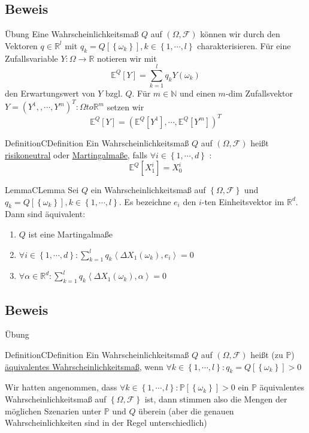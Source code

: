 \documentclass[11.5 pt, a4paper]{memoir}
\begin{document}
\subsection*{Beweis} Übung
Eine Wahrscheinlichkeitsmaß $ Q $ auf $ \left( \Omega, \mathcal{F} \right)  $ können wir durch den Vektoren $ q \in \mathbb{R}^{l} $ 
mit $ q_k = Q \left[ \left\{ \omega_k \right\}  \right] , k \in \left\{ 1 , \cdots,  l \right\}  $ charakterisieren. Für eine Zufallsvariable $ Y : \Omega \to \mathbb{R} $ notieren wir mit 
$$ \mathbb{E}^{Q} \left[ Y \right] = \sum_{k=1}^{l} q_k Y \left( \omega_{k} \right)  $$
den Erwartungswert von $ Y $ bzgl. $ Q $. Für $ m \in \mathbb{N} $ und einen $ m $-dim Zufallsvektor $ Y = \left( Y^{1}, , \cdots,  
Y^{m}\right)^{T}: \Omega to \mathbb{R}^{m} $ setzen wir 
$$ \mathbb{E}^{Q} \left[ Y \right] = \left( \mathbb{E}^{Q} \left[ Y^{1} \right], \cdots,  \mathbb{E}^{Q} \left[ Y^{m} \right]  \right) ^{T}  $$
\begin{ibox}[2.3]{Definition}{CDefinition}
	Ein Wahrscheinlichkeitsmaß $ Q $  auf $ \left( \Omega, \mathcal{F} \right) $ heißt \underline{risikoneutral} oder 
	\underline{Martingalmaße}, falls $ \forall i \in \left\{ 1 , \cdots,  d \right\}  $ :
	$$ \mathbb{E}^{Q} \left[ X_1^{i} \right] = X_{0}^{i}$$
\end{ibox}

\begin{ibox}[2.4]{Lemma}{CLemma}
    Sei $ Q $ ein Wahrscheinlichkeitsmaß auf $ \left\{ \Omega, \mathcal{F} \right\}  $ und $ q_k = Q \left[ \left\{ \omega_k \right\}  \right] , k \in \left\{ 1 , \cdots,  l \right\}  $. Es bezeichne $ e_i $ den $ i$-ten Einheitsvektor im $ \mathbb{R}^{d} $. Dann sind äquivalent:
		\begin{enumerate}[label=\alph*)]
			\item $ Q $ ist eine Martingalmaße
			\item $ \forall i \in \left\{ 1 , \cdots,  d \right\} : \sum_{k=1}^{l} q_k \left< \Delta X_1 (\omega_k), e_i \right>  = 0$ 
			\item $ \forall \alpha \in \mathbb{R}^{d} : \sum_{k=1}^{l} q_k \left< \Delta X_1 (\omega_k), \alpha \right>  = 0$ 
		\end{enumerate}
\end{ibox}
\subsection*{Beweis} Übung
\begin{ibox}[2.5]{Definition}{CDefinition}
	Ein Wahrscheinlichkeitsmaß $ Q $ auf $ \left( \Omega, \mathcal{F} \right)  $ heißt (zu $ \mathbb{P} $) \underline{äquivalentes Wahrscheinlichkeitsmaß}, wenn $ \forall k \in \left\{ 1 , \cdots,  l \right\} : q_k = Q \left[ \left\{ \omega_k \right\}  \right] > 0  $  
\end{ibox}
Wir hatten angenommen, dass $ \forall k \in \left\{ 1 , \cdots,  l \right\} : \mathbb{P} \left[ \left\{ \omega_k \right\}  \right] > 0 $  ein $ \mathbb{P} $ äquivalentes Wahrscheinlichkeitsmaß auf $ \left\{ \Omega, \mathcal{F} \right\}  $ ist, dann stimmen also die Mengen der möglichen Szenarien unter $ \mathbb{P} \text{ und }  Q $ überein (aber die genauen Wahrscheinlichkeiten sind in der Regel unterschiedlich)
\end{document}
